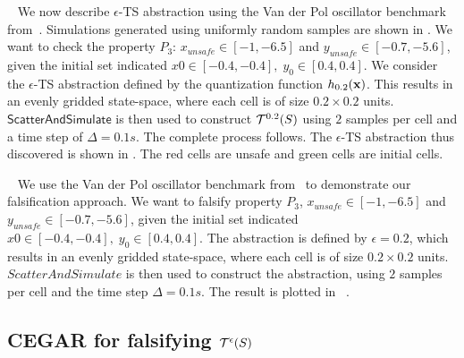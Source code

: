 \begin{example}~\label{ex:vdp}
We now describe $\epsilon$-TS abstraction using the Van der Pol
    oscillator benchmark from~\cite{zutshi2014multiple}. Simulations
    generated using uniformly random samples are shown in
    . We want to check the property $P_3$:
    $x_{unsafe}\in[-1,-6.5]$ and $y_{unsafe}\in[-0.7, -5.6]$, given
    the initial set indicated $x0\in[-0.4, -0.4],\; y_0\in[0.4, 0.4]$.
    We consider the $\epsilon$-TS abstraction defined by the
    quantization function $h_{0.2}(\mathbf{x})$. This results in an
    evenly gridded state-space, where each cell is of size $0.2 \times
    0.2$ units.  $\mathsf{ScatterAndSimulate}$ is then used to
    construct $\mathcal{T}^{0.2}(S)$ using $2$ samples per
    cell and a time step of $\Delta = 0.1s$. The complete process
    follows.  The $\epsilon$-TS abstraction thus discovered is shown
    in . The red cells are unsafe and green cells are
    initial cells.
\end{example}


\begin{example}~\label{ex:vdp}
We use the Van der Pol oscillator benchmark
from~\cite{zutshi2014multiple} to demonstrate our falsification
approach. We want to falsify property $P_3$, $x_{unsafe}\in[-1,
-6.5]$ and $y_{unsafe}\in[-0.7, -5.6]$, given the initial set
indicated $x0\in[-0.4, -0.4],\; y_0\in[0.4, 0.4]$. The abstraction
is defined by $\epsilon=0.2$, which results in an evenly gridded
state-space, where each cell is of size $0.2 \times 0.2$ units.
$ScatterAndSimulate$ is then used to construct the abstraction,
using $2$ samples per cell and the time step $\Delta = 0.1s$. The
result is plotted in ~.
\end{example}

\subsection{CEGAR for falsifying $\mathcal{T}^{\epsilon}(S)$}

